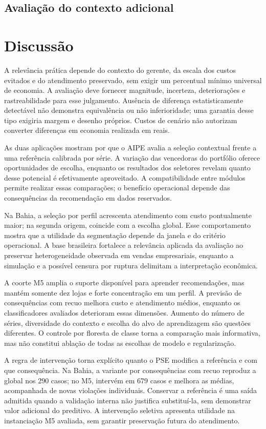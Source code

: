 \documentclass[preprint,12pt]{elsarticle}
\begin{document}
\subsection{Avalia\c{c}\~ao do contexto adicional}


\section{Discussão}
A relevância prática depende do contexto do gerente, da escala dos custos evitados e do atendimento preservado, sem exigir um percentual mínimo universal de economia. A avaliação deve fornecer magnitude, incerteza, deteriorações e rastreabilidade para esse julgamento. Ausência de diferença estatisticamente detectável não demonstra equivalência ou não inferioridade; uma garantia desse tipo exigiria margem e desenho próprios. Custos de cenário não autorizam converter diferenças em economia realizada em reais.

As duas aplicações mostram por que o AIPE avalia a seleção contextual frente a uma referência calibrada por série. A variação das vencedoras do portfólio oferece oportunidades de escolha, enquanto os resultados dos seletores revelam quanto desse potencial é efetivamente aproveitado. A compatibilidade entre módulos permite realizar essas comparações; o benefício operacional depende das consequências da recomendação em dados reservados.

Na Bahia, a seleção por perfil acrescenta atendimento com custo pontualmente maior; na segunda origem, coincide com a escolha global. Esse comportamento mostra que a utilidade da segmentação depende da janela e do critério operacional. A base brasileira fortalece a relevância aplicada da avaliação ao preservar heterogeneidade observada em vendas empresariais, enquanto a simulação e a possível censura por ruptura delimitam a interpretação econômica.

A coorte M5 amplia o suporte disponível para aprender recomendações, mas mantém somente dez lojas e forte concentração em um perfil. A previsão de consequências com recuo melhora custo e atendimento médios, enquanto os classificadores avaliados deterioram essas dimensões. Aumento do número de séries, diversidade do contexto e escolha do alvo de aprendizagem são questões diferentes. O controle por floresta de classe torna a comparação mais informativa, mas não constitui ablação de todas as escolhas de modelo e regularização.

A regra de intervenção torna explícito quanto o PSE modifica a referência e com que consequência. Na Bahia, a variante por consequências com recuo reproduz a global nos 290 casos; no M5, intervém em 679 casos e melhora as médias, acompanhada de novas violações individuais. Conservar a referência é uma saída admitida quando a validação interna não justifica substituí-la, sem demonstrar valor adicional do preditivo. A intervenção seletiva apresenta utilidade na instanciação M5 avaliada, sem garantir preservação futura do atendimento.
\end{document}
